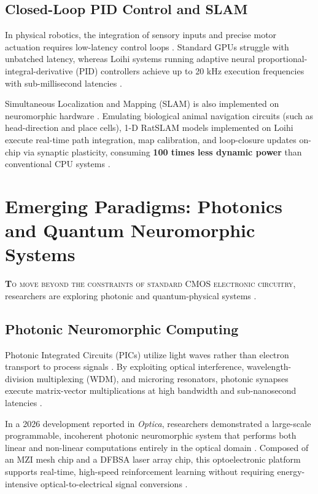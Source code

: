 \documentclass[11pt]{article}
\newcommand{\sectionlead}[2]{\noindent\lettrine[lines=2,lhang=0.08,nindent=0.12em]{\textcolor{IEEEblue}{\bfseries #1}}{\hspace{0.03em}#2}}
\begin{document}
\subsection{Closed-Loop PID Control and SLAM}
In physical robotics, the integration of sensory inputs and precise motor actuation requires low-latency control loops \cite{schuman2017survey}. Standard GPUs struggle with unbatched latency, whereas Loihi systems running adaptive neural proportional-integral-derivative (PID) controllers achieve up to 20 kHz execution frequencies with sub-millisecond latencies \cite{schuman2017survey}.

Simultaneous Localization and Mapping (SLAM) is also implemented on neuromorphic hardware \cite{schuman2017survey}. Emulating biological animal navigation circuits (such as head-direction and place cells), 1-D RatSLAM models implemented on Loihi execute real-time path integration, map calibration, and loop-closure updates on-chip via synaptic plasticity, consuming \textbf{100 times less dynamic power} than conventional CPU systems \cite{schuman2017survey}.

\section{Emerging Paradigms: Photonics and Quantum Neuromorphic Systems}
\sectionlead{T}{o move beyond the constraints of standard CMOS electronic circuitry}, researchers are exploring photonic and quantum-physical systems \cite{farmakidis2024photonic,shastri2021photonics,schuld2015quantum}.

\subsection{Photonic Neuromorphic Computing}
Photonic Integrated Circuits (PICs) utilize light waves rather than electron transport to process signals \cite{farmakidis2024photonic,feldmann2021photonic}. By exploiting optical interference, wavelength-division multiplexing (WDM), and microring resonators, photonic synapses execute matrix-vector multiplications at high bandwidth and sub-nanosecond latencies \cite{farmakidis2024photonic,shastri2021photonics}.


In a 2026 development reported in \emph{Optica}, researchers demonstrated a large-scale programmable, incoherent photonic neuromorphic system that performs both linear and non-linear computations entirely in the optical domain \cite{feldmann2021photonic}. Composed of an MZI mesh chip and a DFBSA laser array chip, this optoelectronic platform supports real-time, high-speed reinforcement learning without requiring energy-intensive optical-to-electrical signal conversions \cite{feldmann2021photonic,shastri2021photonics}.
\end{document}
